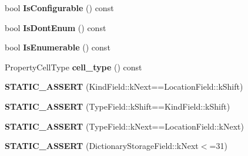 \begin{DoxyCompactItemize}
\item 
bool {\bfseries Is\+Configurable} () const \hypertarget{classv8_1_1internal_1_1_b_a_s_e___e_m_b_e_d_d_e_d_a99a61f011620e512380b254d376c58a6}{}\label{classv8_1_1internal_1_1_b_a_s_e___e_m_b_e_d_d_e_d_a99a61f011620e512380b254d376c58a6}

\item 
bool {\bfseries Is\+Dont\+Enum} () const \hypertarget{classv8_1_1internal_1_1_b_a_s_e___e_m_b_e_d_d_e_d_ab7e17f5bb8e0ac74211e8cb6eef5d6e2}{}\label{classv8_1_1internal_1_1_b_a_s_e___e_m_b_e_d_d_e_d_ab7e17f5bb8e0ac74211e8cb6eef5d6e2}

\item 
bool {\bfseries Is\+Enumerable} () const \hypertarget{classv8_1_1internal_1_1_b_a_s_e___e_m_b_e_d_d_e_d_a68ae46f82bb8ba68eb5f3b66cfe95949}{}\label{classv8_1_1internal_1_1_b_a_s_e___e_m_b_e_d_d_e_d_a68ae46f82bb8ba68eb5f3b66cfe95949}

\item 
Property\+Cell\+Type {\bfseries cell\+\_\+type} () const \hypertarget{classv8_1_1internal_1_1_b_a_s_e___e_m_b_e_d_d_e_d_acef8dadbf5f19152e90892119ae9e951}{}\label{classv8_1_1internal_1_1_b_a_s_e___e_m_b_e_d_d_e_d_acef8dadbf5f19152e90892119ae9e951}

\item 
{\bfseries S\+T\+A\+T\+I\+C\+\_\+\+A\+S\+S\+E\+RT} (Kind\+Field\+::k\+Next==Location\+Field\+::k\+Shift)\hypertarget{classv8_1_1internal_1_1_b_a_s_e___e_m_b_e_d_d_e_d_a8b5c8c3f0b3d9e61cb6fef70705ff030}{}\label{classv8_1_1internal_1_1_b_a_s_e___e_m_b_e_d_d_e_d_a8b5c8c3f0b3d9e61cb6fef70705ff030}

\item 
{\bfseries S\+T\+A\+T\+I\+C\+\_\+\+A\+S\+S\+E\+RT} (Type\+Field\+::k\+Shift==Kind\+Field\+::k\+Shift)\hypertarget{classv8_1_1internal_1_1_b_a_s_e___e_m_b_e_d_d_e_d_a8bda04a0297361820379fabcd92545a9}{}\label{classv8_1_1internal_1_1_b_a_s_e___e_m_b_e_d_d_e_d_a8bda04a0297361820379fabcd92545a9}

\item 
{\bfseries S\+T\+A\+T\+I\+C\+\_\+\+A\+S\+S\+E\+RT} (Type\+Field\+::k\+Next==Location\+Field\+::k\+Next)\hypertarget{classv8_1_1internal_1_1_b_a_s_e___e_m_b_e_d_d_e_d_a3c0aa3ba84ecc9784a789673f48c2b04}{}\label{classv8_1_1internal_1_1_b_a_s_e___e_m_b_e_d_d_e_d_a3c0aa3ba84ecc9784a789673f48c2b04}

\item 
{\bfseries S\+T\+A\+T\+I\+C\+\_\+\+A\+S\+S\+E\+RT} (Dictionary\+Storage\+Field\+::k\+Next$<$=31)\hypertarget{classv8_1_1internal_1_1_b_a_s_e___e_m_b_e_d_d_e_d_ab994d805443ad1ef7ff8b0269ba7eda2}{}\label{classv8_1_1internal_1_1_b_a_s_e___e_m_b_e_d_d_e_d_ab994d805443ad1ef7ff8b0269ba7eda2}


\end{DoxyCompactItemize}
